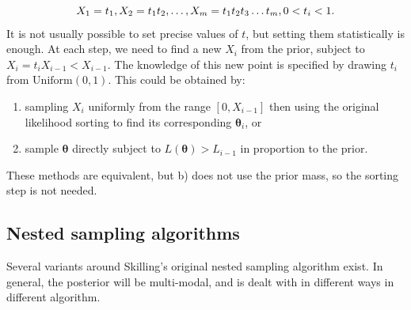 \documentclass{article}
\begin{document}
\begin{equation}
  X_1 = t_1, X_2 = t_1t_2, \dots, X_m = t_1t_2t_3\dots t_m, 0<t_i<1\textrm.
\end{equation}
%
It is not usually possible to set precise values of $t$, but setting them statistically is enough. At each step, we need to find a new $X_i$ from the prior, subject to $X_i = t_i X_{i-1}<X_{i-1}$. The knowledge of this new point is specified by drawing $t_i$ from $\textrm{Uniform}(0, 1)$. This could be obtained by:
\begin{enumerate}
  \item sampling $X_i$ uniformly from the range $[0, X_{i-1}]$ then using the original likelihood sorting to find its corresponding $\bm\theta_i$, or
  \item sample $\bm\theta$ directly subject to $L(\bm\theta)>L_{i-1}$ in proportion to the prior.
\end{enumerate}

These methods are equivalent, but b) does not use the prior mass, so the sorting step is not needed.

\subsection{Nested sampling algorithms}

Several variants around Skilling's original nested sampling algorithm exist. In general, the posterior will be multi-modal, and is dealt with in different ways in different algorithm. 
\end{document}
